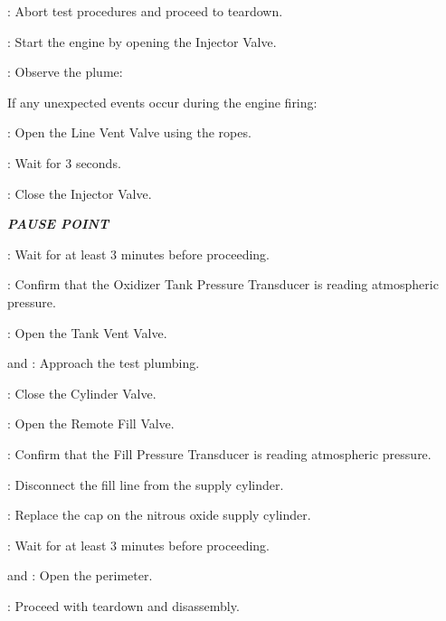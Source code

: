 \begin{checklist}
\begin{checklist}
\begin{checklist}[label=$\bullet$]
\begin{checklist}
                \item \ops: Abort test procedures and proceed to teardown.
            \end{checklist}
        \end{checklist}
        \item \primary: Start the engine by opening the Injector Valve.
    \end{checklist}
    \item \primary: Observe the plume:
    \begin{checklist}[label=$\bullet$]
        \item If any unexpected events occur during the engine firing:
        \begin{checklist}
            \item \primary{}: Open the Line Vent Valve using the ropes.
            \item \primary{}: Wait for 3 seconds.
            \item \primary{}: Close the Injector Valve.
        \end{checklist}
    \end{checklist}
    \item \textbf{\textit{PAUSE POINT}}
    \item \ops{}: Wait for at least 3 minutes before proceeding.
    \item \daq{}: Confirm that the Oxidizer Tank Pressure Transducer is reading atmospheric pressure.
    \item \primary{}: Open the Tank Vent Valve.
    \item \primary{} and \secondary: Approach the test plumbing.
    \item \primary{}: Close the Cylinder Valve.
    \item \primary{}: Open the Remote Fill Valve.
    \item \daq{}: Confirm that the Fill Pressure Transducer is reading atmospheric pressure.
    \item \primary{}: Disconnect the fill line from the supply cylinder.
    \item \primary{}: Replace the cap on the nitrous oxide supply cylinder.
    \item \ops{}: Wait for at least 3 minutes before proceeding.
    \item \peri{} and \perii{}: Open the perimeter.
    \item \ops{}: Proceed with teardown and disassembly.

\end{checklist}
\setcounter{checklistnum}{0}

